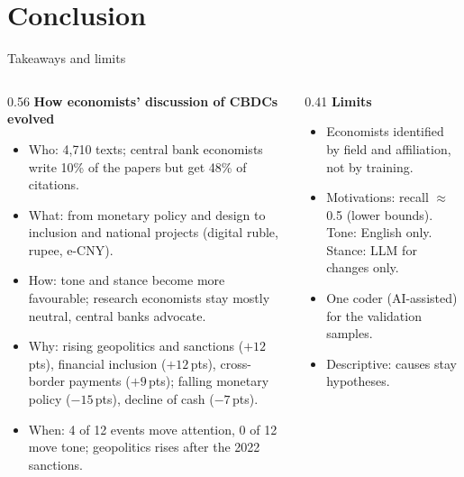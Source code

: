 \documentclass[aspectratio=169,10pt]{beamer}
\begin{document}
\section{Conclusion}

\begin{frame}{Takeaways and limits}
\begin{columns}[T]
\begin{column}{0.56\textwidth}\footnotesize
\textbf{How economists' discussion of CBDCs evolved}
\begin{itemize}\setlength\itemsep{1pt}
\item \alert{Who:} 4,710 texts; central bank economists write 10\% of the papers but get 48\% of citations.
\item \alert{What:} from monetary policy and design to inclusion and national projects (digital ruble, rupee, e-CNY).
\item \alert{How:} tone and stance become more favourable; research economists stay mostly neutral, central banks advocate.
\item \alert{Why:} rising geopolitics and sanctions ($+12$\,pts), financial inclusion ($+12$\,pts), cross-border payments ($+9$\,pts); falling monetary policy ($-15$\,pts), decline of cash ($-7$\,pts).
\item \alert{When:} 4 of 12 events move attention, 0 of 12 move tone; geopolitics rises after the 2022 sanctions.
\end{itemize}
\end{column}
\begin{column}{0.41\textwidth}\footnotesize
\textbf{Limits}
\begin{itemize}\setlength\itemsep{1pt}
\item Economists identified by field and affiliation, not by training.
\item Motivations: recall $\approx$ 0.5 (lower bounds). Tone: English only. Stance: LLM for changes only.
\item One coder (AI-assisted) for the validation samples.
\item Descriptive: causes stay hypotheses.
\end{itemize}

\end{column}
\end{columns}
\end{frame}
\end{document}
